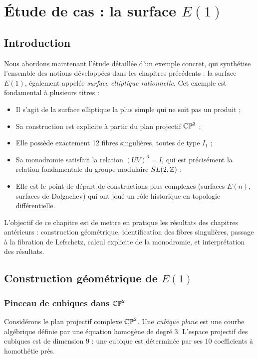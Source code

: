 \chapter{Étude de cas : la surface $E(1)$}

\section{Introduction}

Nous abordons maintenant l'étude détaillée d'un exemple concret, qui synthétise l'ensemble des notions développées dans les chapitres précédents : la surface $E(1)$, également appelée \emph{surface elliptique rationnelle}. Cet exemple est fondamental à plusieurs titres :

\begin{itemize}
\item Il s'agit de la surface elliptique la plus simple qui ne soit pas un produit ;
\item Sa construction est explicite à partir du plan projectif $\mathbb{CP}^2$ ;
\item Elle possède exactement 12 fibres singulières, toutes de type $I_1$ ;
\item Sa monodromie satisfait la relation $(UV)^6 = I$, qui est précisément la relation fondamentale du groupe modulaire $SL(2,\mathbb{Z})$ ;
\item Elle est le point de départ de constructions plus complexes (surfaces $E(n)$, surfaces de Dolgachev) qui ont joué un rôle historique en topologie différentielle.
\end{itemize}

L'objectif de ce chapitre est de mettre en pratique les résultats des chapitres antérieurs : construction géométrique, identification des fibres singulières, passage à la fibration de Lefschetz, calcul explicite de la monodromie, et interprétation des résultats.

\section{Construction géométrique de $E(1)$}

\subsection{Pinceau de cubiques dans $\mathbb{CP}^2$}

Considérons le plan projectif complexe $\mathbb{CP}^2$. Une \emph{cubique plane} est une courbe algébrique définie par une équation homogène de degré 3. L'espace projectif des cubiques est de dimension 9 : une cubique est déterminée par ses 10 coefficients à homothétie près.

